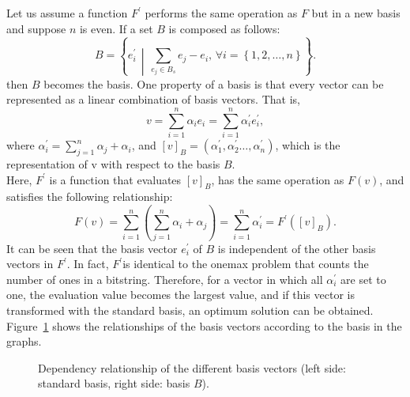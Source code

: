 Let us assume a function $ F^\prime $ performs the same operation as $ F $ but in a new basis and suppose $ n $ is even. If a set $ B $ is composed as follows:
\begin{equation}
B=\left\{e_i^\prime \,\middle|\, \sum_{e_j\in B_s} e_j-e_i,\, \forall i=\left\{1,2,\ldots,n\right\}\right\}.
\end{equation}
then $ B $ becomes the basis. One property of a basis is that every vector can be represented as a linear combination of basis vectors. That is,
\begin{equation}
v=\sum_{i=1}^{n}{\alpha_ie_i}=\sum_{i=1}^{n}{\alpha_i^\prime e_i^\prime},
\end{equation}
where $ \alpha_i^\prime=\sum_{j=1}^{n}\alpha_j+\alpha_i $, and $ \left[v\right]_B=\left(\alpha_1^\prime,\alpha_2^\prime\ldots,\alpha_n^\prime\right) $, which is the representation of v with respect to the basis $ B $.\\
Here, $ F^\prime $ is a function that evaluates $ \left[v\right]_B $, has the same operation as $ F\left(v\right) $, and satisfies the following relationship:
\begin{equation}
F\left(v\right)=\sum_{i=1}^{n}\left(\sum_{j=1}^{n}{\alpha_i+\alpha_j}\right)=\sum_{i=1}^{n}\alpha_i^\prime=F^\prime\left(\left[v\right]_B\right) .
\end{equation}
It can be seen that the basis vector $ e_i^\prime $ of $ B $ is independent of the other basis vectors in $ F^\prime $. In fact, $ F^\prime  $is identical to the onemax problem that counts the number of ones in a bitstring. Therefore, for a vector in which all $ \alpha_i^\prime $ are set to one, the evaluation value becomes the largest value, and if this vector is transformed with the standard basis, an optimum solution can be obtained. Figure~\ref{fig:rel} shows the relationships of the basis vectors according to the basis in the graphs.
\begin{figure}[ht!]
	\centering
	\caption{Dependency relationship of the different basis vectors (left side: standard basis, right side: basis $ B $).} \label{fig:rel}
\end{figure}

